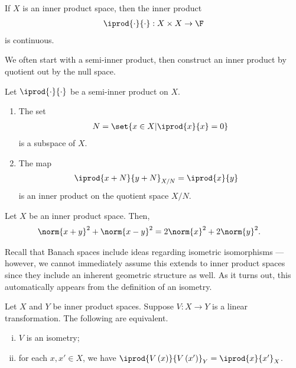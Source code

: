 \documentclass[10pt]{mypackage}
\begin{document}
\begin{proposition}
  If $X$ is an inner product space, then the inner product
  \begin{align*}
    \iprod{\cdot}{\cdot}:X\times X \rightarrow \F
  \end{align*}
  is continuous.
\end{proposition}
We often start with a semi-inner product, then construct an inner product by quotient out by the null space.
\begin{proposition}
  Let $ \iprod{\cdot}{\cdot} $ be a semi-inner product on $X$.
  \begin{enumerate}[(1)]
    \item The set
      \begin{align*}
        N = \set{x\in X | \iprod{x}{x} = 0}
      \end{align*}
      is a subspace of $X$.
    \item The map
      \begin{align*}
        \iprod{x+N}{y+N}_{X/N} &= \iprod{x}{y}
      \end{align*}
      is an inner product on the quotient space $X/N$.
  \end{enumerate}
\end{proposition}
\begin{proposition}
Let $X$ be an inner product space. Then,
\begin{align*}
  \norm{x+y}^2 + \norm{x-y}^2 &= 2\norm{x}^2 + 2\norm{y}^2.
\end{align*}
\end{proposition}
Recall that Banach spaces include ideas regarding isometric isomorphisms --- however, we cannot immediately assume this extends to inner product spaces since they include an inherent geometric structure as well. As it turns out, this automatically appears from the definition of an isometry.
\begin{proposition}
  Let $X$ and $Y$ be inner product spaces. Suppose $V: X\rightarrow Y$ is a linear transformation. The following are equivalent.
  \begin{enumerate}[(i)]
    \item $V$ is an isometry;
    \item for each $x,x'\in X$, we have $ \iprod{V\left(x\right)}{V\left(x'\right)}_{Y} = \iprod{x}{x'}_{X} $.
  \end{enumerate}
\end{proposition}
\end{document}
